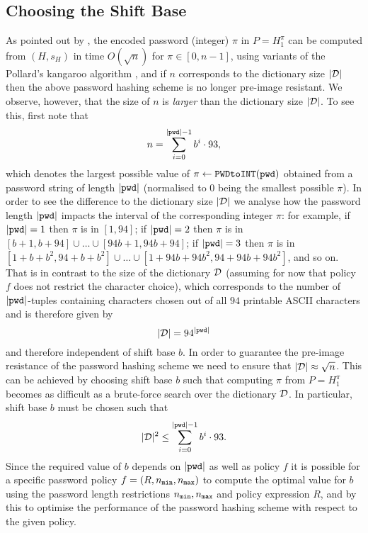 \subsection{Choosing the Shift Base}\label{rem:basischoice}
As pointed out by \citet{BenhamoudaP13}, the encoded password (integer) $\pi$ in $P=H_1^\pi$ can be computed from $(H, s_H)$ in time $O(\sqrt{n})$ for $\pi \in [0,n-1]$, \eg using variants of the Pollard's kangaroo algorithm \cite{Pollard78}, and if $n$ corresponds to the dictionary size $|\mathcal{D}|$ then the above password hashing scheme is no longer pre-image resistant. 
We observe, however, that the size of $n$ is \emph{larger} than the dictionary size $|\mathcal{D}|$. 
To see this, first note that 
\[n=\sum_{i=0}^{|\mathtt{pwd}|-1}b^i\cdot 93,\] 
which denotes the largest possible value of $\pi \gets \texttt{PWDtoINT}(\mathtt{pwd})$ obtained from a password string of length $|\mathtt{pwd}|$ (normalised to $0$ being the smallest possible $\pi$). 
In order to see the difference to the dictionary size $|\mathcal{D}|$ we analyse how the password length $|\mathtt{pwd}|$ impacts the interval of the corresponding integer $\pi$: for example, if $|\mathtt{pwd}| = 1$ then $\pi$ is in $[1,94]$; if $|\mathtt{pwd}|=2$ then $\pi$ is in $[b+1,b+94]\cup \dots \cup[94b+1,94b+94]$; if $|\mathtt{pwd}|=3$ then $\pi$ is in  $[1+b+b^2,94+b+b^2]\cup\dots\cup[1+94b+94b^2,94+94b+94b^2]$, and so on. 
That is in contrast to the size of the dictionary $\mathcal{D}$ (assuming for now that policy $f$ does not restrict the character choice), which corresponds to the number of $|\mathtt{pwd}|$-tuples containing characters chosen out of all $94$ printable \ac{ASCII} characters and is therefore given by 
\[|\mathcal{D}| = 94^{|\mathtt{pwd}|}\]
and therefore independent of shift base $b$.
In order to guarantee the pre-image resistance of the password hashing scheme we need to ensure that $|\mathcal{D}| \approx \sqrt{n}$.
This can be achieved by choosing shift base $b$ such that computing $\pi$ from $P=H_1^\pi$ becomes as difficult as a brute-force search over the dictionary $\mathcal{D}$. 
In particular, shift base $b$ must be chosen such that 
\begin{equation}\label{eq:hashlimit}
  |\mathcal{D}|^2\leq \sum_{i=0}^{|\mathtt{pwd}|-1}b^i\cdot 93.
\end{equation}
Since the required value of $b$ depends on $|\mathtt{pwd}|$ as well as policy $f$ it is possible for a specific password policy $f=(R,{n_\mathtt{min}},{n_\mathtt{max}})$ to compute the optimal value for $b$ using the password length restrictions ${n_\mathtt{min}},{n_\mathtt{max}}$ and policy expression $R$, and by this to optimise the performance of the password hashing scheme with respect to the given policy. 
